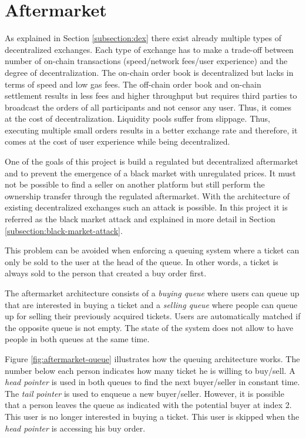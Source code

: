 
\section{Aftermarket}\label{section:aftermarket}
As explained in Section \ref{subsection:dex} there exist already multiple types of decentralized exchanges. Each type of exchange has to make a trade-off between number of on-chain transactions (speed/network fees/user experience) and the degree of decentralization. The on-chain order book is decentralized but lacks in terms of speed and low gas fees. The off-chain order book and on-chain settlement results in less fees and higher throughput but requires third parties to broadcast the orders of all participants and not censor any user. Thus, it comes at the cost of decentralization. Liquidity pools suffer from slippage. Thus, executing multiple small orders results in a better exchange rate and therefore, it comes at the cost of user experience while being decentralized.

One of the goals of this project is build a regulated but decentralized aftermarket and to prevent the emergence of a black market with unregulated prices. It must not be possible to find a seller on another platform but still perform the ownership transfer through the regulated aftermarket. With the architecture of existing decentralized exchanges such an attack is possible. In this project it is referred as the black market attack and explained in more detail in Section \ref{subsection:black-market-attack}. 

This problem can be avoided when enforcing a queuing system where a ticket can only be sold to the user at the head of the queue. In other words, a ticket is always sold to the person that created a buy order first. 

The aftermarket architecture consists of a \textit{buying queue} where users can queue up that are interested in buying a ticket and a \textit{selling queue} where people can queue up for selling their previously acquired tickets. Users are automatically matched if the opposite queue is not empty. The state of the system does not allow to have people in both queues at the same time. 

Figure \ref{fig:aftermarket-queue} illustrates how the queuing architecture works. The number below each person indicates how many ticket he is willing to buy/sell. A \textit{head pointer} is used in both queues to find the next buyer/seller in constant time. The \textit{tail pointer} is used to enqueue a new buyer/seller. However, it is possible that a person leaves the queue as indicated with the potential buyer at index 2. This user is no longer interested in buying a ticket. This user is skipped when the \textit{head pointer} is accessing his buy order. 

